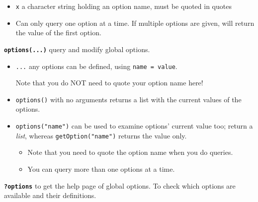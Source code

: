 \documentclass[
  a4paper,
  twoside,
  openright]{book}
\newenvironment{Shaded}{\begin{snugshade}}{\end{snugshade}}
\newcommand{\DecValTok}[1]{\textcolor[rgb]{0.00,0.00,0.81}{#1}}
\newcommand{\FunctionTok}[1]{\textcolor[rgb]{0.13,0.29,0.53}{\textbf{#1}}}
\newcommand{\NormalTok}[1]{#1}
\newcommand{\SpecialCharTok}[1]{\textcolor[rgb]{0.81,0.36,0.00}{\textbf{#1}}}
\newcommand{\StringTok}[1]{\textcolor[rgb]{0.31,0.60,0.02}{#1}}
\providecommand{\tightlist}{%
  \setlength{\itemsep}{0pt}\setlength{\parskip}{0pt}}
\theoremstyle{definition}
\theoremstyle{definition}
\theoremstyle{definition}
\theoremstyle{definition}
\theoremstyle{remark}
\begin{document}
\begin{itemize}
\tightlist
\item
  \texttt{x} a {character string }holding an option name, must be {quoted in quotes}
\item
  Can only query one option at a time. If multiple options are given, will return the value of the first option.
\end{itemize}

\textbf{\texttt{options(...)}} query and modify global options.

\begin{itemize}
\item
  \texttt{...} any options can be defined, using \texttt{name\ =\ value}.

  Note that you do {NOT need to quote your option name} here!
\item
  \texttt{options()} with no arguments returns a list with the current values of the options.
\item
  \texttt{options("name")} can be used to examine options' current value too; return a \emph{list}, whereas \texttt{getOption("name")} returns the value only.

  \begin{itemize}
  \item
    Note that you need to quote the option name when you do queries.
  \item
    You can query more than one options at a time.

\begin{Shaded}
\end{Shaded}
  \end{itemize}
\end{itemize}

\textbf{\texttt{?options}} to get the help page of global options. To check which options are available and their definitions.
\end{document}
